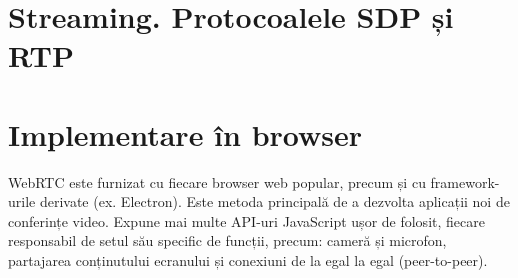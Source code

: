\section{Streaming. Protocoalele SDP și RTP}
\label{sec:ch3sec3}

\section{Implementare în browser}
\label{sec:ch3sec4}
\indent \par WebRTC este furnizat cu fiecare browser web popular, precum și cu framework-urile derivate (ex. Electron). Este metoda principală de a dezvolta aplicații noi de conferințe video. Expune mai multe API-uri JavaScript ușor de folosit, fiecare responsabil de setul său specific de funcții, precum: cameră și microfon, partajarea conținutului ecranului și conexiuni de la egal la egal (peer-to-peer).

